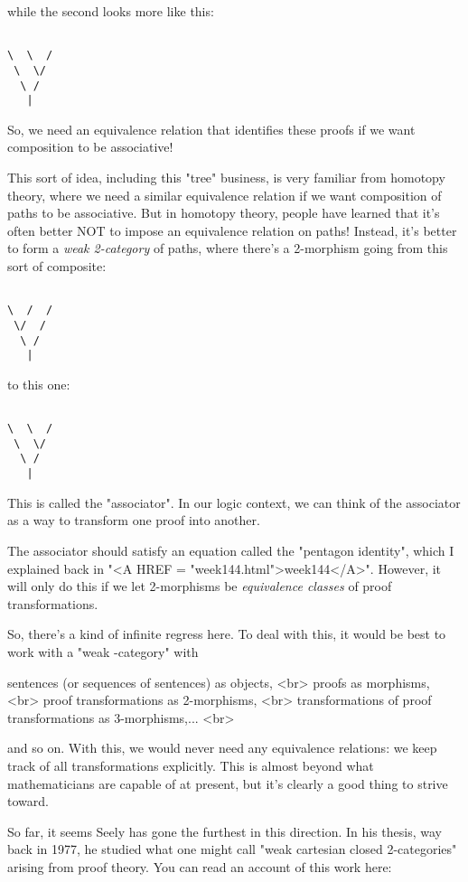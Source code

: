 while the second looks more like this:


\begin{verbatim}

\  \  /
 \  \/
  \ /
   |
\end{verbatim}
    
So, we need an equivalence relation that identifies these proofs
if we want composition to be associative! 

This sort of idea, including this "tree" business, is very familiar 
from homotopy theory, where we need a similar equivalence relation if we
want composition of paths to be associative.  But in homotopy theory, 
people have learned that it's often better NOT to impose an equivalence 
relation on paths!  Instead, it's better to form a \emph{weak 2-category} 
of paths, where there's a 2-morphism going from this sort of composite:


\begin{verbatim}

\  /  /
 \/  /
  \ /
   |
\end{verbatim}
    
to this one:


\begin{verbatim}

\  \  /
 \  \/
  \ /
   |
\end{verbatim}
    

This is called the "associator".  In our logic context, we can 
think of 
the associator as a way to transform one proof into another.  

The associator should satisfy an equation called 
the "pentagon identity",
which I explained back in "<A HREF = "week144.html">week144</A>".  
However, it will only do this if
we let 2-morphisms be \emph{equivalence classes} of proof transformations.

So, there's a kind of infinite regress here.  To deal with this, it
would be best to work with a "weak \omega -category" with

sentences (or sequences of sentences) as objects, <br>
proofs as morphisms, <br>
proof transformations as 2-morphisms, <br>
transformations of proof transformations as 3-morphisms,... <br>

and so on.   With this, we would never need any equivalence relations:
we keep track of all transformations explicitly.  This is almost beyond 
what mathematicians are capable of at present, but it's clearly a good 
thing to strive toward.

So far, it seems Seely has gone the furthest in this direction.
In his thesis, way back in 1977, he studied what one might call "weak 
cartesian closed 2-categories" arising from proof theory.  You can read 
an account of this work here:


